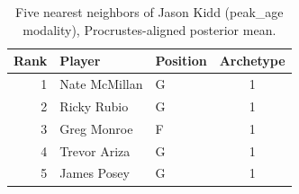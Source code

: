 \begin{table}[htbp]
  \centering\small
  \begin{tabular}{rllc}
    \toprule
    Rank & Player & Position & Archetype \\
    \midrule
    1 & Nate McMillan & G & 1 \\
    2 & Ricky Rubio & G & 1 \\
    3 & Greg Monroe & F & 1 \\
    4 & Trevor Ariza & G & 1 \\
    5 & James Posey & G & 1 \\
    \bottomrule
  \end{tabular}
  \caption{Five nearest neighbors of Jason Kidd (peak_age modality), Procrustes-aligned posterior mean.}
  \label{tab:Jason_Kidd_neighbors_peak_age}
\end{table}


